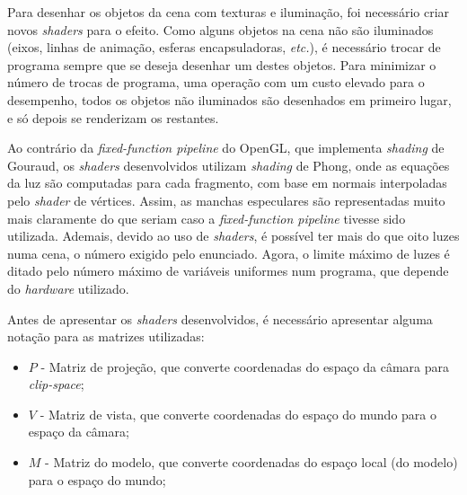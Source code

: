 \documentclass[12pt, a4paper]{article}
\begin{document}
Para desenhar os objetos da cena com texturas e iluminação, foi necessário criar novos
\emph{shaders} para o efeito. Como alguns objetos na cena não são iluminados (eixos, linhas de
animação, esferas encapsuladoras, \emph{etc.}), é necessário trocar de programa sempre que se deseja
desenhar um destes objetos. Para minimizar o número de trocas de programa, uma operação com um custo
elevado para o desempenho, todos os objetos não iluminados são desenhados em primeiro lugar, e só
depois se renderizam os restantes.

Ao contrário da \emph{fixed-function pipeline} do OpenGL, que implementa \emph{shading} de Gouraud,
os \emph{shaders} desenvolvidos utilizam \emph{shading} de Phong, onde as equações da luz são
computadas para cada fragmento, com base em normais interpoladas pelo \emph{shader} de vértices.
Assim, as manchas especulares são representadas muito mais claramente do que seriam caso a
\emph{fixed-function pipeline} tivesse sido utilizada. Ademais, devido ao uso de \emph{shaders}, é
possível ter mais do que oito luzes numa cena, o número exigido pelo enunciado. Agora, o limite
máximo de luzes é ditado pelo número máximo de variáveis uniformes num programa, que depende do
\emph{hardware} utilizado.

Antes de apresentar os \emph{shaders} desenvolvidos, é necessário apresentar alguma notação para as
matrizes utilizadas:

\begin{itemize}
    \item $P$ - Matriz de projeção, que converte coordenadas do espaço da câmara para
        \emph{clip-space};
    \item $V$ - Matriz de vista, que converte coordenadas do espaço do mundo para o espaço da
        câmara;
    \item $M$ - Matriz do modelo, que converte coordenadas do espaço local (do modelo) para o espaço
        do mundo;
\end{itemize}
\end{document}

